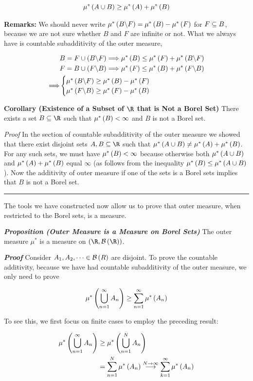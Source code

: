 \documentclass[
]{article}
\begin{document}
\[\mu^*\pr{A\cup B}\ge \mu^*\pr{A}+\mu^*\pr{B}\]

\textbf{Remarks:} We should never write
\(\mu^*\pr{B\c F} = \mu^*\pr{B}-\mu^*\pr{F}\) for \(F\se B\), because we
are not sure whether \(B\) and \(F\) are infinite or not. What we always
have is countable subadditivity of the outer measure,

\[\ba
&\ba
B = F\cup\pr{B\c F}& \too \mu^*\pr{B}\le \mu^*\pr{F}+\mu^*\pr{B\c F}
\\F = B\cup \pr{F\c B}&\too \mu^*\pr{F}\le \mu^*\pr{B}+\mu^*\pr{F\c B}
\ea\\
\too &\bc
\mu^*\pr{B\c F}\ge \mu^*\pr{B}-\mu^*\pr{F}\\
\mu^*\pr{F\c B}\ge \mu^*\pr{F}-\mu^*\pr{B}
\ec
\ea\]

\textbf{Corollary (Existence of a Subset of \(\R\) that is Not a Borel
Set)} There exists a set \(B\se \R\) such that \(\mu^*\pr{B}<\infty\)
and \(B\) is not a Borel set.

\emph{Proof} In the section of countable subadditivity of the outer
measure we showed that there exist disjoint sets \(A,B\se \R\) such that
\(\mu^*\pr{A\cup B}\ne \mu^*\pr{A}+\mu^*\pr{B}\). For any such sets, we
must have \(\mu^*\pr{B}<\infty\) because otherwise both
\(\mu^*\pr{A\cup B}\) and \(\mu^*\pr{A}+\mu^*\pr B\) equal \(\infty\)
(as follows from the inequality \(\mu^*\pr{B}\le \mu^*\pr{A\cup B}\)).
Now the additivity of outer measure if one of the sets is a Borel sets
implies that \(B\) is not a Borel set.

\begin{center}\rule{0.5\linewidth}{0.5pt}\end{center}

The tools we have constructed now allow us to prove that outer measure,
when restricted to the Borel sets, is a measure.

\emph{\textbf{Proposition (Outer Measure is a Measure on Borel Sets)}}
The outer measure \(\mu^*\) is a measure on \(\pr{\R,\B\pr{\R}}\).

\emph{\textbf{Proof}} Consider \(A_1,A_2,\cdots\in \B\pr{R}\) are
disjoint. To prove the countable additivity, because we have had
countable subadditivity of the outer measure, we only need to prove

\[\mu^*\pr{\uinf[n]A_n}\ge \sinf[n]\mu^*\pr{A_n}\]

To see this, we first focus on finite cases to employ the preceding
result:

\[\ba
\mu^*\pr{\uinf[n]A_n} & \ge \mu^*\pr{\bigcup_{n = 1}^N A_n}\\
& = \sum_{n = 1}^N \mu^*\pr{A_n}\overset{N\to\infty}{\longrightarrow}\sinf \mu^*\pr{A_n}
\ea\]
\end{document}
